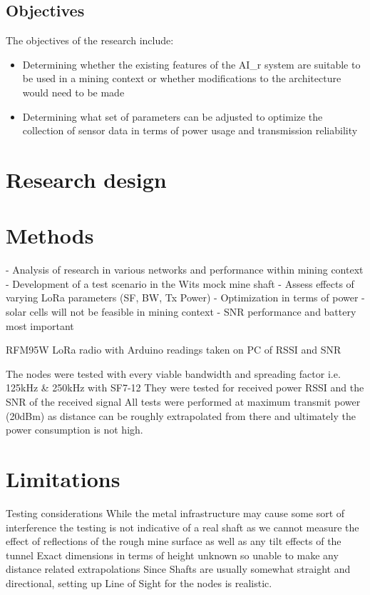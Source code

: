 \documentclass[a4paper,twoside,12pt]{report}
\begin{document}
\subsection{Objectives}
The objectives of the research include:
\begin{itemize}
    \item Determining whether the existing features of the AI\_r system are suitable to be used in a mining context or whether modifications to the architecture would need to be made
    \item Determining what set of parameters can be adjusted to optimize the collection of sensor data in terms of power usage and transmission reliability
\end{itemize}

\section{Research design}
\section{Methods}
- Analysis of research in various networks and performance within mining context
- Development of a test scenario in the Wits mock mine shaft
- Assess effects of varying LoRa parameters (SF, BW, Tx Power)
- Optimization in terms of power - solar cells will not be feasible in mining context
- SNR performance and battery most important

RFM95W LoRa radio with Arduino readings taken on PC of RSSI and SNR

The nodes were tested with every viable bandwidth and spreading factor i.e. 125kHz & 250kHz with SF7-12
They were tested for received power RSSI and the SNR of the received signal
All tests were performed at maximum transmit power (20dBm) as distance can be roughly extrapolated from there and ultimately the power consumption is not high.


\section{Limitations}

Testing considerations
While the metal infrastructure may cause some sort of interference the testing is not indicative of a real shaft as we cannot measure the effect of reflections of the rough mine surface as well as any tilt effects of the tunnel
Exact dimensions in terms of height unknown so unable to make any distance related extrapolations
Since Shafts are usually somewhat straight and directional, setting up Line of Sight for the nodes is realistic.
\end{document}
